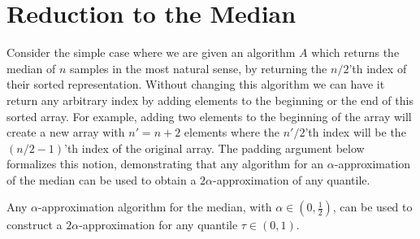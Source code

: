 \section{Reduction to the Median} 

\label{appendix: Reduction to the Median}
Consider the simple case where we are given an algorithm $A$ which returns the median of $n$ samples in the most natural sense, by returning the $n/2$'th index of their sorted representation. Without changing this algorithm we can have it return any arbitrary index by adding elements to the beginning or the end of this sorted array. For example, adding two elements to the beginning of the array will create a new array with $n'=n+2$ elements where the $n'/2$'th index will be the $(n/2-1)$'th index of the original array. The padding argument below formalizes this notion, demonstrating that any algorithm for an $\alpha$-approximation of the median can be used to obtain a $2\alpha$-approximation of any quantile.
\begin{lemma} 
\label{appendix: padding argument}
Any $\alpha$-approximation algorithm for the median, with $\alpha \in \left(0,\frac{1}{2}\right)$, can be used to construct a $2\alpha$-approximation for any quantile $\tau\in (0,1)$. 
\end{lemma}
